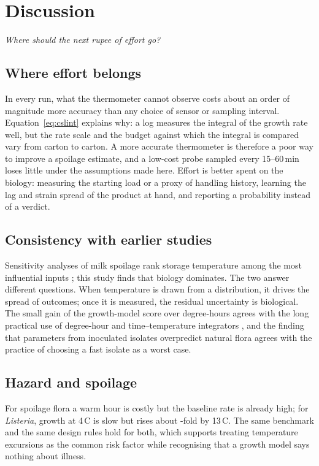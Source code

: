 \documentclass[11pt,a4paper,twoside,openany]{book}
\newcommand{\hook}[1]{{\noindent\fontsize{14}{20}\selectfont\itshape\color{dggrey}#1\par}\vspace{14pt}}
\newcommand{\degC}{\,\textdegree C}
\theoremstyle{plain}\newtheorem{proposition}{Proposition}\newtheorem{corollary}{Corollary}
\theoremstyle{definition}\newtheorem{definition}{Definition}[chapter]
\begin{document}
\chapter{Discussion}\label{ch:disc}
\hook{Where should the next rupee of effort go?}
\section{Where effort belongs}
In every run, what the thermometer cannot observe costs about an order of magnitude more accuracy than any choice of sensor or sampling interval. Equation~\eqref{eq:cslint} explains why: a log measures the integral of the growth rate well, but the rate scale and the budget against which the integral is compared vary from carton to carton. A more accurate thermometer is therefore a poor way to improve a spoilage estimate, and a low-cost probe sampled every 15--60\,min loses little under the assumptions made here. Effort is better spent on the biology: measuring the starting load or a proxy of handling history, learning the lag and strain spread of the product at hand, and reporting a probability instead of a verdict.

\section{Consistency with earlier studies}
Sensitivity analyses of milk spoilage rank storage temperature among the most influential inputs \cite{lau2022,buehler2018,qian2023,giannakourou2020}; this study finds that biology dominates. The two answer different questions. When temperature is drawn from a distribution, it drives the spread of outcomes; once it is measured, the residual uncertainty is biological. The small gain of the growth-model score over degree-hours agrees with the long practical use of degree-hour and time--temperature integrators \cite{taoukis1989,kim2020}, and the finding that parameters from inoculated isolates overpredict natural flora agrees with the practice of choosing a fast isolate as a worst case.

\section{Hazard and spoilage}
For spoilage flora a warm hour is costly but the baseline rate is already high; for \textit{Listeria}, growth at 4\degC{} is slow but rises about \NumLisRatio-fold by 13\degC. The same benchmark and the same design rules hold for both, which supports treating temperature excursions as the common risk factor while recognising that a growth model says nothing about illness.
\end{document}
